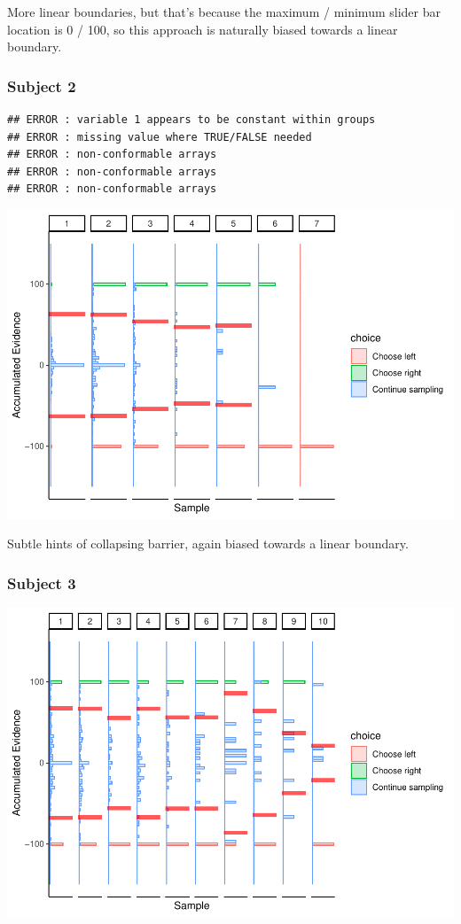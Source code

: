 \documentclass[
]{book}
\begin{document}
More linear boundaries, but that's because the maximum / minimum slider bar location is 0 / 100, so this approach is naturally biased towards a linear boundary.

\hypertarget{subject-2-1}{%
\subsubsection*{Subject 2}\label{subject-2-1}}

\begin{verbatim}
## ERROR : variable 1 appears to be constant within groups 
## ERROR : missing value where TRUE/FALSE needed 
## ERROR : non-conformable arrays 
## ERROR : non-conformable arrays 
## ERROR : non-conformable arrays
\end{verbatim}

\includegraphics{LateNightBayes_files/figure-latex/unnamed-chunk-24-1.pdf}

Subtle hints of collapsing barrier, again biased towards a linear boundary.

\hypertarget{subject-3-1}{%
\subsubsection*{Subject 3}\label{subject-3-1}}

\includegraphics{LateNightBayes_files/figure-latex/unnamed-chunk-25-1.pdf}
\end{document}
